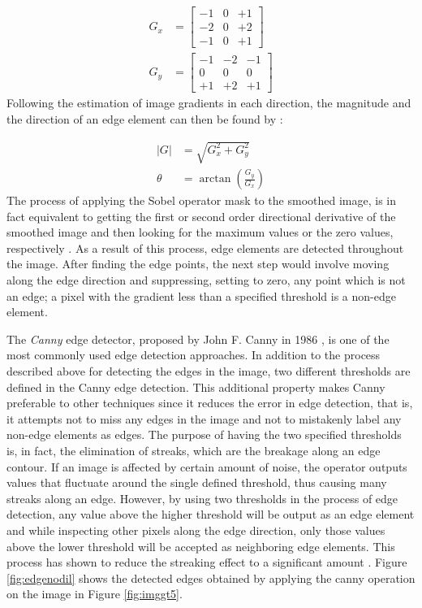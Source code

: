 \begin{align}
G_{x} &= \begin{bmatrix}
-1 & 0 & +1 \\ 
-2 & 0 & +2 \\ 
-1 & 0 & +1
\end{bmatrix} \\
G_{y} &= \begin{bmatrix}
-1 & -2 & -1 \\ 
0 & 0 & 0 \\ 
+1 & +2 & +1
\end{bmatrix}
\end{align} \newline
Following the estimation of image gradients in each direction, the magnitude and the direction of an edge element can then be found by \cite{sze11}:

\begin{align}
\left | G \right | &= \sqrt{G_{x}^{2} + G_{y}^{2}} \\
\theta &= \arctan (\frac{G_{y}}{G_{x}})
\end{align} \newline
The process of applying the Sobel operator mask to the smoothed image, is in fact equivalent to getting 
the first or second order directional derivative of the smoothed image and then looking for the maximum values or the zero values, 
respectively \cite{sze11}. 
As a result of this process, edge elements are detected throughout the image.
After finding the edge points, the next step would involve moving along the edge direction and suppressing, setting to zero, any point which is not an edge;
a pixel with the gradient less than a specified threshold is a non-edge element.

The {\it Canny} edge detector, proposed by John F. Canny in 1986 \cite{canny86}, is one of the most commonly used edge detection approaches. In addition 
to the process described above for detecting the edges in the image, two different thresholds are defined in the Canny edge detection. This
additional property makes Canny preferable to other techniques since it reduces the error in edge detection, that is, it attempts
not to miss any edges in the image and not to mistakenly label any non-edge elements as edges.
The purpose of having the two specified thresholds is, in fact, the elimination of streaks, which are the breakage along an edge contour.
If an image is affected by certain amount of noise, the operator outputs values that fluctuate around the single defined threshold, thus
causing many streaks along an edge.
However, by using two thresholds in the process of edge detection, 
any value above the higher threshold will be output as an edge element and while inspecting other pixels along 
the edge direction, only those values above the lower threshold will be accepted as neighboring edge elements.
This process has shown to reduce the streaking effect to a significant amount \cite{canny86}. \newline
Figure \ref{fig:edgenodil} shows the detected edges obtained by applying the canny operation on the image in Figure \ref{fig:imggt5}.

